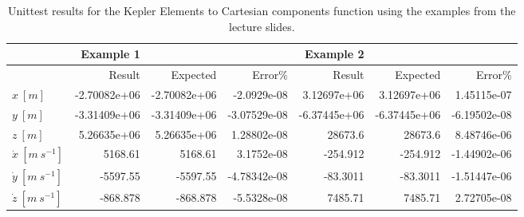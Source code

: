     \begin{table}[h!] \centering
        \begin{tabular}{l||rrr|rrr}
                                   & Example 1       &                 &              & Example 2     \\
            \hline \hline
                                   &          Result &        Expected &      Error\% &          Result &        Expected &      Error\% \\
            \hline
            $x\ [m]$               &    -2.70082e+06 &    -2.70082e+06 & -2.0929e-08  &     3.12697e+06 &     3.12697e+06 &  1.45115e-07 \\
            $y\ [m]$               &    -3.31409e+06 &    -3.31409e+06 & -3.07529e-08 &    -6.37445e+06 &    -6.37445e+06 & -6.19502e-08 \\
            $z\ [m]$               &     5.26635e+06 &     5.26635e+06 &  1.28802e-08 & 28673.6         & 28673.6         &  8.48746e-06 \\
            $\dot{x}\ [m\ s^{-1}]$ &  5168.61        &  5168.61        &  3.1752e-08  &  -254.912       &  -254.912       & -1.44902e-06 \\
            $\dot{y}\ [m\ s^{-1}]$ & -5597.55        & -5597.55        & -4.78342e-08 &   -83.3011      &   -83.3011      & -1.51447e-06 \\
            $\dot{z}\ [m\ s^{-1}]$ &  -868.878       &  -868.878       & -5.5328e-08  &  7485.71        &  7485.71        &  2.72705e-08 \\
            \hline
            \end{tabular}
            \caption{Unittest results for the Kepler Elements to Cartesian components function using the examples from the lecture slides.}
        \label{tab:ketccut}
    \end{table}


